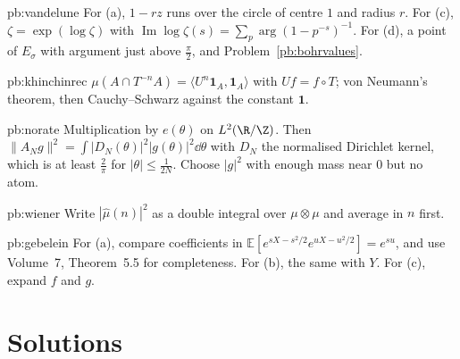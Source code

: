 \begin{hint}{pb:vandelune}
For (a), $1-rz$ runs over the circle of centre $1$ and radius $r$. For (c), $\zeta=\exp(\log\zeta)$ with $\operatorname{Im}\log\zeta(s)=\sum_p\arg(1-p^{-s})^{-1}$. For (d), a point of
$E_\sigma$ with argument just above $\frac\pi2$, and Problem~\ref{pb:bohrvalues}.
\end{hint}

\begin{hint}{pb:khinchinrec}
$\mu(A\cap T^{-n}A)=\langle U^n\mathbf 1_A,\mathbf 1_A\rangle$ with $Uf=f\circ T$; von Neumann's theorem, then Cauchy--Schwarz against the constant $\mathbf 1$.
\end{hint}

\begin{hint}{pb:norate}
Multiplication by $e(\theta)$ on $L^2(\R/\Z)$. Then $\|A_Ng\|^2=\int|D_N(\theta)|^2|g(\theta)|^2\dd\theta$ with $D_N$ the normalised Dirichlet kernel, which is at least $\frac2\pi$ for
$|\theta|\le\frac1{2N}$. Choose $|g|^2$ with enough mass near $0$ but no atom.
\end{hint}

\begin{hint}{pb:wiener}
Write $|\hat\mu(n)|^2$ as a double integral over $\mu\otimes\mu$ and average in $n$ first.
\end{hint}

\begin{hint}{pb:gebelein}
For (a), compare coefficients in $\mathbb E[e^{sX-s^2/2}e^{uX-u^2/2}]=e^{su}$, and use Volume~7, Theorem~5.5 for completeness. For (b), the same with $Y$. For (c), expand $f$ and $g$.
\end{hint}

\section*{Solutions}

